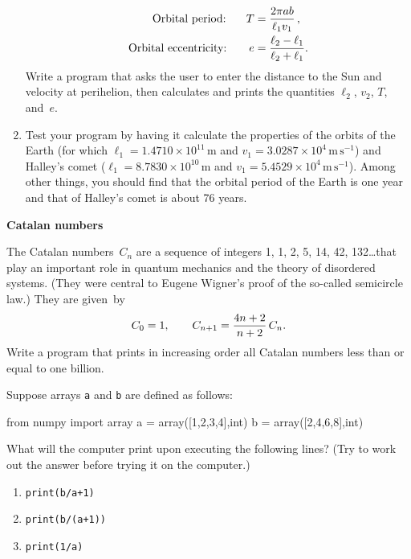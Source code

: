 \documentclass[12pt]{article}
\begin{document}
\begin{exercises}
\begin{enumerate}
\begin{align*}
\textrm{Orbital period:} \hspace{1.80em}
  T &= {2\pi ab\over\ell_1 v_1}\,, \\
\textrm{Orbital eccentricity:} \qquad e &=
  {\ell_2-\ell_1\over\ell_2+\ell_1}.
\end{align*}
Write a program that asks the user to enter the distance to the Sun and
velocity at perihelion, then calculates and prints the quantities
$\ell_2$, $v_2$, $T$, and~$e$.
\item Test your program by having it calculate the properties of the orbits
  of the Earth (for which $\ell_1=1.4710\times10^{11}\,$m and
  $v_1=3.0287\times10^4\,\mathrm{m\,s^{-1}}$) and Halley's comet
  ($\ell_1=8.7830\times10^{10}\,$m and
  $v_1=5.4529\times10^4\,\mathrm{m\,s^{-1}}$).  Among other things, you
  should find that the orbital period of the Earth is one year and that of
  Halley's comet is about 76 years.
\end{enumerate}



\exercise \textbf{Catalan numbers}

\exskip The Catalan numbers~$C_n$ are a sequence of integers 1, 1, 2, 5,
14, 42, 132\dots that play an important role in quantum mechanics and the
theory of disordered systems.  (They were central to Eugene Wigner's proof
of the so-called semicircle law.)  They are given~by
\begin{displaymath}
C_0 = 1,\qquad C_{n+1} = {4n+2\over n+2}\,C_n.
\end{displaymath}
Write a program that prints in increasing order all Catalan numbers less
than or equal to one billion.



\exercise Suppose arrays \verb|a| and \verb|b| are defined as follows:
\begin{code}
from numpy import array
a = array([1,2,3,4],int)
b = array([2,4,6,8],int)
\end{code}
What will the computer print upon executing the following lines?  (Try to
work out the answer before trying it on the computer.)
\begin{enumerate}\setlength{\itemsep}{0pt}\setlength{\parskip}{0pt}
\item \verb|print(b/a+1)|
\item \verb|print(b/(a+1))|
\item \verb|print(1/a)|
\end{enumerate}




\end{exercises}
\end{document}
